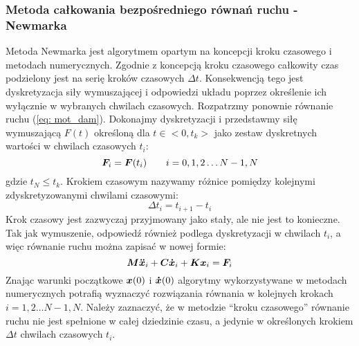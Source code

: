 \subsubsection{Metoda całkowania bezpośredniego równań ruchu - Newmarka}
Metoda Newmarka jest algorytmem opartym na koncepcji kroku czasowego i metodach numerycznych. Zgodnie z koncepcją kroku czasowego całkowity czas podzielony jest na serię kroków czasowych $\Delta t$. Konsekwencją tego jest dyskretyzacja siły wymuszającej i odpowiedzi układu poprzez określenie ich wyłącznie w wybranych chwilach czasowych. Rozpatrzmy ponownie równanie ruchu (\ref{eq: mot_dam}). Dokonajmy dyskretyzacji i przedstawmy siłę wymuszającą $F(t)$ określoną dla $t\in<0,t_k>$ jako zestaw dyskretnych wartości w chwilach czasowych $t_i$:
\begin{equation}
	\bm{F}_i=\bm{F}(t_i) \qquad i = 0,1,2\dots N-1,N
\end{equation}
gdzie $t_N\leq t_k$. Krokiem czasowym nazywamy różnice pomiędzy kolejnymi zdyskretyzowanymi chwilami czasowymi:
\begin{equation}
	\Delta t_i = t_{i+1}-t_i
\end{equation}
Krok czasowy jest zazwyczaj przyjmowany jako stały, ale nie jest to konieczne. Tak jak wymuszenie, odpowiedź również podlega dyskretyzacji w chwilach $t_i$, a więc równanie ruchu można zapisać w nowej formie:
\begin{equation} \label{eq: motion_time_step}
	\bm{M}\bm{\ddot{x}}_i+\bm{C}\bm{\dot{x}}_i+\bm{K}\bm{x}_i = \bm{F}_i
\end{equation}
Znając warunki początkowe $\bm{x}(0)$ i $\bm{\dot{x}}(0)$ algorytmy wykorzystywane w metodach numerycznych potrafią wyznaczyć rozwiązania równania w kolejnych krokach $i = 1,2\dots N-1,N$. Należy zaznaczyć, że w metodzie \enquote{kroku czasowego} równanie ruchu nie jest spełnione w całej dziedzinie czasu, a jedynie w określonych krokiem $\Delta t$ chwilach czasowych $t_i$.

